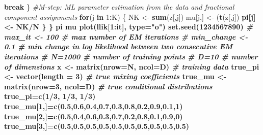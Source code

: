 \documentclass[]{article}
\newenvironment{Shaded}{\begin{snugshade}}{\end{snugshade}}
\newcommand{\KeywordTok}[1]{\textcolor[rgb]{0.13,0.29,0.53}{\textbf{#1}}}
\newcommand{\DataTypeTok}[1]{\textcolor[rgb]{0.13,0.29,0.53}{#1}}
\newcommand{\DecValTok}[1]{\textcolor[rgb]{0.00,0.00,0.81}{#1}}
\newcommand{\FloatTok}[1]{\textcolor[rgb]{0.00,0.00,0.81}{#1}}
\newcommand{\StringTok}[1]{\textcolor[rgb]{0.31,0.60,0.02}{#1}}
\newcommand{\CommentTok}[1]{\textcolor[rgb]{0.56,0.35,0.01}{\textit{#1}}}
\newcommand{\ControlFlowTok}[1]{\textcolor[rgb]{0.13,0.29,0.53}{\textbf{#1}}}
\newcommand{\OperatorTok}[1]{\textcolor[rgb]{0.81,0.36,0.00}{\textbf{#1}}}
\newcommand{\NormalTok}[1]{#1}
\begin{document}
\begin{Shaded}
\begin{Highlighting}[]
\ControlFlowTok{break}
\NormalTok{\}}
\CommentTok{#M-step: ML parameter estimation from the data and fractional component assignments}
\ControlFlowTok{for}\NormalTok{(j }\ControlFlowTok{in} \DecValTok{1}\OperatorTok{:}\NormalTok{K)}
\NormalTok{\{}
\NormalTok{NK <-}\StringTok{ }\KeywordTok{sum}\NormalTok{(z[,j])}
\NormalTok{mu[j,] <-}\StringTok{ }\NormalTok{(}\KeywordTok{t}\NormalTok{(z[,j])}\OperatorTok{%*%}\NormalTok{x)}\OperatorTok{/}\KeywordTok{sum}\NormalTok{(z[,j])}
\NormalTok{pi[j] <-}\StringTok{ }\NormalTok{NK}\OperatorTok{/}\NormalTok{N}
\NormalTok{\}}
\NormalTok{\}}
\NormalTok{pi}
\NormalTok{mu}
\KeywordTok{plot}\NormalTok{(llik[}\DecValTok{1}\OperatorTok{:}\NormalTok{it], }\DataTypeTok{type=}\StringTok{"o"}\NormalTok{)}
\KeywordTok{set.seed}\NormalTok{(}\DecValTok{1234567890}\NormalTok{)}
\CommentTok{# max_it <- 100 # max number of EM iterations}
\CommentTok{# min_change <- 0.1 # min change in log likelihood between two consecutive EM iterations}
\CommentTok{# N=1000 # number of training points}
\CommentTok{# D=10 # number of dimensions}
\NormalTok{x <-}\StringTok{ }\KeywordTok{matrix}\NormalTok{(}\DataTypeTok{nrow=}\NormalTok{N, }\DataTypeTok{ncol=}\NormalTok{D) }\CommentTok{# training data}
\NormalTok{true_pi <-}\StringTok{ }\KeywordTok{vector}\NormalTok{(}\DataTypeTok{length =} \DecValTok{3}\NormalTok{) }\CommentTok{# true mixing coefficients}
\NormalTok{true_mu <-}\StringTok{ }\KeywordTok{matrix}\NormalTok{(}\DataTypeTok{nrow=}\DecValTok{3}\NormalTok{, }\DataTypeTok{ncol=}\NormalTok{D) }\CommentTok{# true conditional distributions}
\NormalTok{true_pi=}\KeywordTok{c}\NormalTok{(}\DecValTok{1}\OperatorTok{/}\DecValTok{3}\NormalTok{, }\DecValTok{1}\OperatorTok{/}\DecValTok{3}\NormalTok{, }\DecValTok{1}\OperatorTok{/}\DecValTok{3}\NormalTok{)}
\NormalTok{true_mu[}\DecValTok{1}\NormalTok{,]=}\KeywordTok{c}\NormalTok{(}\FloatTok{0.5}\NormalTok{,}\FloatTok{0.6}\NormalTok{,}\FloatTok{0.4}\NormalTok{,}\FloatTok{0.7}\NormalTok{,}\FloatTok{0.3}\NormalTok{,}\FloatTok{0.8}\NormalTok{,}\FloatTok{0.2}\NormalTok{,}\FloatTok{0.9}\NormalTok{,}\FloatTok{0.1}\NormalTok{,}\DecValTok{1}\NormalTok{)}
\NormalTok{true_mu[}\DecValTok{2}\NormalTok{,]=}\KeywordTok{c}\NormalTok{(}\FloatTok{0.5}\NormalTok{,}\FloatTok{0.4}\NormalTok{,}\FloatTok{0.6}\NormalTok{,}\FloatTok{0.3}\NormalTok{,}\FloatTok{0.7}\NormalTok{,}\FloatTok{0.2}\NormalTok{,}\FloatTok{0.8}\NormalTok{,}\FloatTok{0.1}\NormalTok{,}\FloatTok{0.9}\NormalTok{,}\DecValTok{0}\NormalTok{)}
\NormalTok{true_mu[}\DecValTok{3}\NormalTok{,]=}\KeywordTok{c}\NormalTok{(}\FloatTok{0.5}\NormalTok{,}\FloatTok{0.5}\NormalTok{,}\FloatTok{0.5}\NormalTok{,}\FloatTok{0.5}\NormalTok{,}\FloatTok{0.5}\NormalTok{,}\FloatTok{0.5}\NormalTok{,}\FloatTok{0.5}\NormalTok{,}\FloatTok{0.5}\NormalTok{,}\FloatTok{0.5}\NormalTok{,}\FloatTok{0.5}\NormalTok{)}
}
\end{Highlighting}
\end{Shaded}
\end{document}
